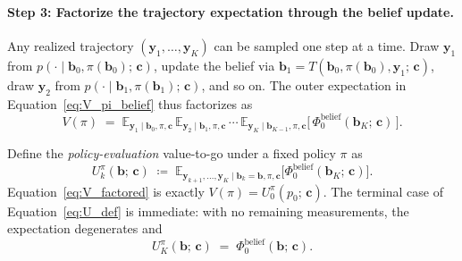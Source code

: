 \documentclass[11pt]{article}
\newcommand{\bc}{\bm{c}}
\newcommand{\by}{\bm{y}}
\newcommand{\bb}{\bm{b}}
\newcommand{\E}{\mathbb{E}}
\begin{document}
\paragraph{Step 3: Factorize the trajectory expectation through the belief update.}  Any realized trajectory $(\by_1, \ldots, \by_K)$ can be sampled one step at a time.  Draw $\by_1$ from $p(\cdot \mid \bb_0, \pi(\bb_0);\, \bc)$, update the belief via $\bb_1 = T(\bb_0, \pi(\bb_0), \by_1;\, \bc)$, draw $\by_2$ from $p(\cdot \mid \bb_1, \pi(\bb_1);\, \bc)$, and so on.  The outer expectation in Equation~\eqref{eq:V_pi_belief} thus factorizes as
\begin{equation}
V(\pi) \;=\; \E_{\by_1 \mid \bb_0, \pi, \bc}\, \E_{\by_2 \mid \bb_1, \pi, \bc}\, \cdots\, \E_{\by_K \mid \bb_{K-1}, \pi, \bc}\!\bigl[\,\Phi_0^{\mathrm{belief}}(\bb_K;\, \bc)\,\bigr].
\label{eq:V_factored}
\end{equation}

Define the \emph{policy-evaluation} value-to-go under a fixed policy $\pi$ as
\begin{equation}
U^\pi_k(\bb;\, \bc) \;\coloneqq\; \E_{\by_{k+1}, \ldots, \by_K \mid \bb_k = \bb, \pi, \bc}\!\bigl[\Phi_0^{\mathrm{belief}}(\bb_K;\, \bc)\bigr].
\label{eq:U_def}
\end{equation}
Equation~\eqref{eq:V_factored} is exactly $V(\pi) = U^\pi_0(p_0;\, \bc)$.  The terminal case of Equation~\eqref{eq:U_def} is immediate: with no remaining measurements, the expectation degenerates and
\begin{equation}
U^\pi_K(\bb;\, \bc) \;=\; \Phi_0^{\mathrm{belief}}(\bb;\, \bc).
\label{eq:U_terminal}
\end{equation}
\end{document}
